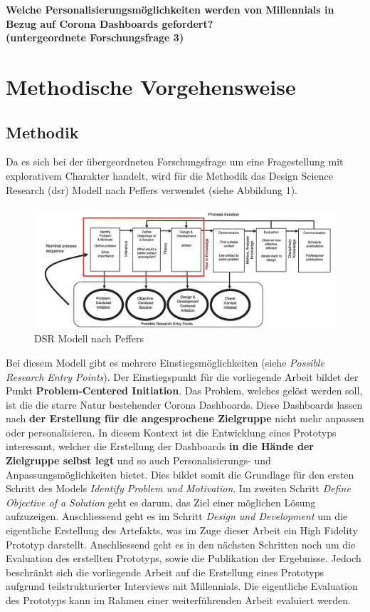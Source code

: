 \documentclass[12pt, oneside]{article}
\begin{document}
\begin{center}
\textbf{Welche Personalisierungsmöglichkeiten werden von Millennials in Bezug auf Corona Dashboards gefordert?\\
(untergeordnete Forschungsfrage 3)}
\end{center}

\clearpage
\section{Methodische Vorgehensweise}
\subsection{Methodik}
Da es sich bei der übergeordneten Forschungsfrage um eine Fragestellung mit explorativem Charakter handelt, wird für die Methodik das Design Science Research (\Gls{dsr}) Modell nach Peffers verwendet (siehe Abbildung 1).


\begin{figure}[ht]
	\includegraphics[width=12cm]{images/peffers_dsr_model.png}
	\centering
	\caption{DSR Modell nach Peffers ~\citep{K.Peffers.2007}}
\end{figure}

Bei diesem Modell gibt es mehrere Einstiegsmöglichkeiten (siehe \textit{Possible Research Entry Points}). Der Einstiegspunkt für die vorliegende Arbeit bildet der Punkt \textbf{Problem-Centered Initiation}. Das Problem, welches gelöst werden soll, ist die die starre Natur bestehender Corona Dashboards. Diese Dashboards lassen nach \textbf{der Erstellung für die angesprochene Zielgruppe} nicht mehr anpassen oder personalisieren. In diesem Kontext ist die Entwicklung eines Prototyps interessant, welcher die Erstellung der Dashboards \textbf{in die Hände der Zielgruppe selbst legt} und so auch Personalisierungs- und Anpassungsmöglichkeiten bietet. Dies bildet somit die Grundlage für den ersten Schritt des Models \textit{Identify Problem und Motivation}. Im zweiten Schritt \textit{Define Objective of a Solution} geht es darum, das Ziel einer möglichen Lösung aufzuzeigen. Anschliessend geht es im Schritt \textit{Design und Development} um die eigentliche Erstellung des Artefakts, was im Zuge dieser Arbeit ein High Fidelity Prototyp darstellt. Anschliessend geht es in den nächsten Schritten noch um die Evaluation des erstellten Prototyps, sowie die Publikation der Ergebnisse. Jedoch beschränkt sich die vorliegende Arbeit auf die Erstellung eines Prototyps aufgrund teilstrukturierter Interviews mit Millennials. Die eigentliche Evaluation des Prototyps kann im Rahmen einer weiterführenden Arbeit evaluiert werden.
\end{document}
